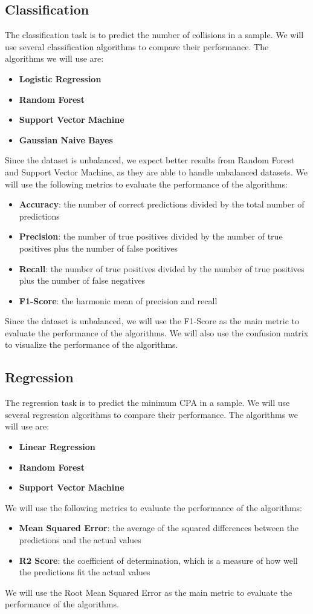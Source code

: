 \subsection{Classification}
The classification task is to predict the number of collisions in a sample. We will use several classification algorithms to compare their performance. The algorithms we will use are:
\begin{itemize}
    \item \textbf{Logistic Regression}
    \item \textbf{Random Forest}
    \item \textbf{Support Vector Machine}
    \item \textbf{Gaussian Naive Bayes}
\end{itemize}
Since the dataset is unbalanced, we expect better results from Random Forest and Support Vector Machine, as they are able to handle unbalanced datasets.
We will use the following metrics to evaluate the performance of the algorithms:
\begin{itemize}
    \item \textbf{Accuracy}: the number of correct predictions divided by the total number of predictions
    \item \textbf{Precision}: the number of true positives divided by the number of true positives plus the number of false positives
    \item \textbf{Recall}: the number of true positives divided by the number of true positives plus the number of false negatives
    \item \textbf{F1-Score}: the harmonic mean of precision and recall
\end{itemize}
Since the dataset is unbalanced, we will use the F1-Score as the main metric to evaluate the performance of the algorithms. We will also use the confusion matrix to visualize the performance of the algorithms.

\subsection{Regression}
The regression task is to predict the minimum CPA in a sample. We will use several regression algorithms to compare their performance. The algorithms we will use are:
\begin{itemize}
    \item \textbf{Linear Regression}
    \item \textbf{Random Forest}
    \item \textbf{Support Vector Machine}
\end{itemize}
We will use the following metrics to evaluate the performance of the algorithms:
\begin{itemize}
    \item \textbf{Mean Squared Error}: the average of the squared differences between the predictions and the actual values
    \item \textbf{R2 Score}: the coefficient of determination, which is a measure of how well the predictions fit the actual values
\end{itemize}
We will use the Root Mean Squared Error as the main metric to evaluate the performance of the algorithms.
